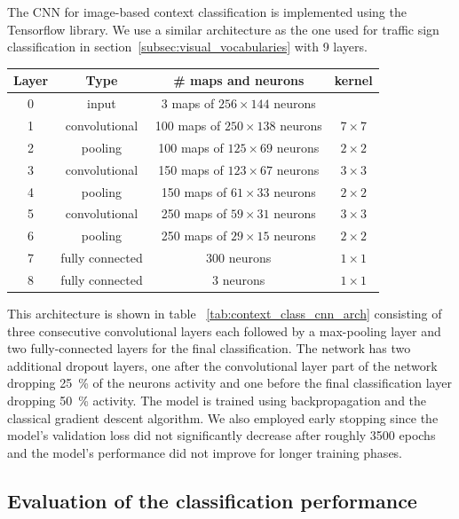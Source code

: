The \ac{CNN} for image-based context classification is implemented using the Tensorflow \cite{Abadi2016} library.
We use a similar architecture as the one used for traffic sign classification in section~\ref{subsec:visual_vocabularies} with \num{9} layers.
\begin{center}
    \begin{tabular}{c|c|c|c}
         Layer & Type & \# maps and neurons & kernel \\
		\hline
         0 & input & \num{3} maps of $256 \times 144$ neurons & \\ 
         1 & convolutional & \num{100} maps of $250 \times 138$ neurons & $7 \times 7$ \\
         2 & pooling & \num{100} maps of $125 \times 69$ neurons & $2 \times 2$ \\
         3 & convolutional & \num{150} maps of $123 \times 67$ neurons & $3 \times 3$ \\
         4 & pooling & \num{150} maps of $61 \times 33$ neurons & $2 \times 2$ \\
         5 & convolutional & \num{250} maps of $59 \times 31$ neurons & $3 \times 3$ \\
         6 & pooling & \num{250} maps of $29 \times 15$ neurons & $2 \times 2$ \\
         7 & fully connected & \num{300} neurons & $1 \times 1$ \\
         8 & fully connected & \num{3} neurons & $1 \times 1$ 
    \end{tabular}
	\label{tab:context_class_cnn_arch}
\end{center}
This architecture is shown in table ~\ref{tab:context_class_cnn_arch} consisting of three consecutive convolutional layers each followed by a max-pooling layer and two fully-connected layers for the final classification.
The network has two additional dropout layers, one after the convolutional layer part of the network dropping \SI{25}{\percent} of the neurons activity and one before the final classification layer dropping \SI{50}{\percent} activity.
The model is trained using backpropagation and the classical gradient descent algorithm.
We also employed early stopping since the model's validation loss did not significantly decrease after roughly \num{3500} epochs and the model's performance did not improve for longer training phases.

\subsection{Evaluation of the classification performance}%
\label{subsec:evaluation_of_the_classification_performance}

